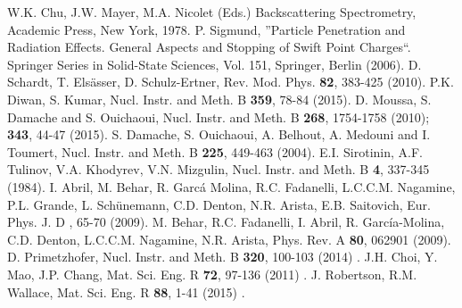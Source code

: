 \documentclass[aps,prb,reprint,groupedaddress]{revtex4-1}
\begin{document}
\begin{thebibliography}{00}
 W.K. Chu, J.W. Mayer, M.A. Nicolet (Eds.) Backscattering Spectrometry, Academic Press, New York, 1978.
 P. Sigmund, ''Particle Penetration and Radiation Effects. General Aspects and Stopping of Swift Point Charges``.
Springer Series in Solid-State Sciences, Vol. 151, Springer, Berlin (2006).
 D. Schardt, T. Els\"asser, D. Schulz-Ertner, Rev. Mod. Phys. \textbf{82},  383-425 (2010).
 P.K. Diwan, S. Kumar, Nucl. Instr. and Meth. B \textbf{359}, 78-84 (2015).
 D. Moussa, S. Damache and S. Ouichaoui, Nucl. Instr. and Meth. B \textbf{268}, 1754-1758 (2010); \textbf{343},  44-47 (2015).
 S. Damache, S. Ouichaoui, A. Belhout, A. Medouni and I. Toumert, Nucl. Instr. and Meth. B \textbf{225}, 449-463 (2004).
 E.I. Sirotinin, A.F. Tulinov, V.A. Khodyrev, V.N. Mizgulin, Nucl. Instr. and Meth. B \textbf{4}, 337-345 (1984).
 I. Abril, M. Behar, R. Garc\'a Molina, R.C. Fadanelli, L.C.C.M. Nagamine, P.L. Grande, L. Sch\"unemann, C.D. Denton, N.R. Arista, E.B. Saitovich,
Eur. Phys. J. D , 65-70 (2009).
 M. Behar, R.C. Fadanelli, I. Abril, R. García-Molina, C.D. Denton, L.C.C.M. Nagamine, N.R. Arista, Phys. Rev. A \textbf{80},  062901 (2009).
 D. Primetzhofer, Nucl. Instr. and Meth. B \textbf{320}, 100-103 (2014) .
 J.H. Choi, Y. Mao, J.P. Chang, Mat. Sci. Eng. R \textbf{72}, 97-136 (2011) .
 J. Robertson, R.M. Wallace, Mat. Sci. Eng. R \textbf{88}, 1-41 (2015) .

\end{thebibliography}
\end{document}

